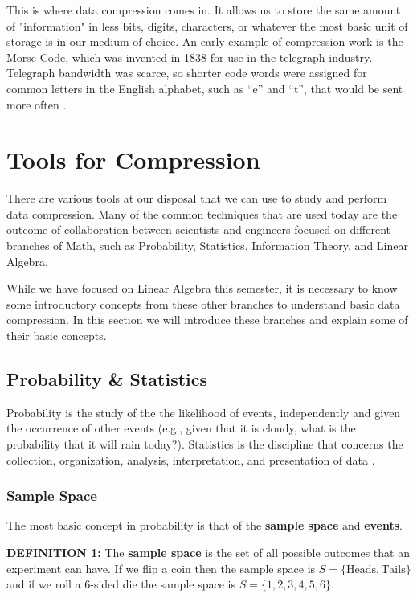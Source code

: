 \documentclass[12pt]{extarticle}
\begin{document}
        This is where data compression comes in. It allows us to store the same amount of "information" in less bits, digits, characters, or whatever the most basic unit of storage is in our medium of choice. An early example of compression work is the Morse Code, which was invented in 1838 for use in the telegraph industry. Telegraph bandwidth was scarce, so shorter code words were assigned for common letters in the English alphabet, such as ``e'' and ``t'', that would be sent more often \cite{Wolfram2002}.
    
    \section{Tools for Compression}
        There are various tools at our disposal that we can use to study and perform data compression. Many of the common techniques that are used today are the outcome of collaboration between scientists and engineers focused on different branches of Math, such as Probability, Statistics, Information Theory, and Linear Algebra.
        
        While we have focused on Linear Algebra this semester, it is necessary to know some introductory concepts from these other branches to understand basic data compression. In this section we will introduce these branches and explain some of their basic concepts.
        
        \subsection{Probability \& Statistics}
            Probability is the study of the the likelihood of events, independently and given the occurrence of other events (e.g., given that it is cloudy, what is the probability that it will rain today?). Statistics is the discipline that concerns the collection, organization, analysis, interpretation, and presentation of data \cite{wiki:Statistics}.

            \subsubsection{Sample Space}
                The most basic concept in probability is that of the \textbf{sample space} and \textbf{events}.
    
                \textbf{DEFINITION 1:} The \textbf{sample space} is the set of all possible outcomes that an experiment can have. If we flip a coin then the sample space is $S = \{ \text{Heads}, \text{Tails}\}$ and if we roll a 6-sided die the sample space is $S = \{ 1, 2, 3, 4, 5, 6 \}$. 
                
\end{document}
